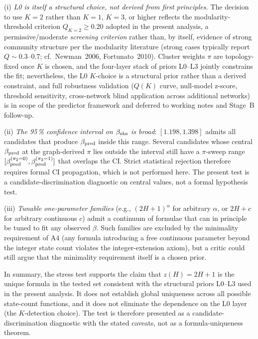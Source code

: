 (i) \emph{L0 is itself a structural choice, not derived from first principles.} The decision to use \(K{=}2\) rather than \(K{=}1\), \(K{=}3\), or higher reflects the modularity-threshold criterion \(Q_{K=2}\geq 0.20\) adopted in the present analysis, a permissive/moderate \emph{screening criterion} rather than, by itself, evidence of strong community structure per the modularity literature (strong cases typically report \(Q{\sim}0.3\)--\(0.7\); cf.~Newman~2006, Fortunato~2010). Cluster weights \(\pi\) are topology-fixed once \(K\) is chosen, and the four-layer stack of priors L0--L3 jointly constrains the fit; nevertheless, the L0 \(K\)-choice is a structural prior rather than a derived constraint, and full robustness validation (\(Q(K)\) curve, null-model z-score, threshold sensitivity, cross-network blind application across additional networks) is in scope of the predictor framework and deferred to working notes and Stage~B follow-up.

(ii) \emph{The 95\,\% confidence interval on \(\beta_{\rm obs}\) is broad}: \([1.198,1.398]\) admits all candidates that produce \(\beta_{\rm pred}\) inside this range. Several candidates whose central \(\beta_{\rm pred}\) at the graph-derived \(\pi\) lies outside the interval still have a \(\pi\)-sweep range \([\beta_{\rm pred}^{(\pi_2=0)},\beta_{\rm pred}^{(\pi_2=1)}]\) that overlaps the CI. Strict statistical rejection therefore requires formal CI propagation, which is not performed here. The present test is a candidate-discrimination diagnostic on central values, not a formal hypothesis test.

(iii) \emph{Tunable one-parameter families} (e.g., \((2H{+}1)^\alpha\) for arbitrary \(\alpha\), or \(2H{+}c\) for arbitrary continuous \(c\)) admit a continuum of formulae that can in principle be tuned to fit any observed \(\beta\). Such families are excluded by the minimality requirement of A4 (any formula introducing a free continuous parameter beyond the integer state count violates the integer-extension axiom), but a critic could still argue that the minimality requirement itself is a chosen prior.

In summary, the stress test supports the claim that \(z(H){=}2H{+}1\) is the unique formula in the tested set consistent with the structural priors L0--L3 used in the present analysis. It does not establish global uniqueness across all possible state-count functions, and it does not eliminate the dependence on the L0 layer (the \(K\)-detection choice). The test is therefore presented as a candidate-discrimination diagnostic with the stated caveats, not as a formula-uniqueness theorem.

